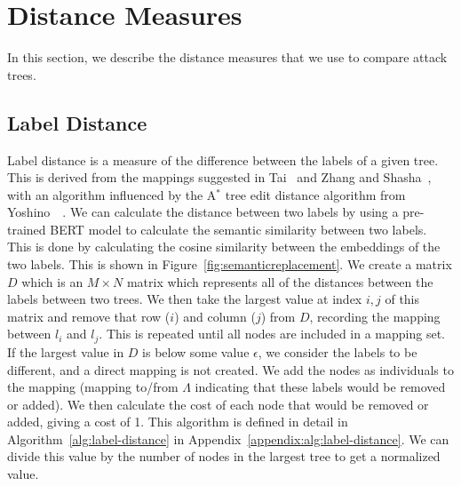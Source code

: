 \section{Distance Measures}
\label{sec:distance}

In this section, we describe the distance measures that we use to compare attack trees. 




\subsection{Label Distance}
\label{ssec:label-distance}

Label distance is a measure of the difference between the labels of a given tree. This is derived from the mappings suggested in Tai~\cite{tai_tree--tree_1979} and Zhang and Shasha~\cite{Zhang_Shasha_1989}, with an algorithm influenced by the A$^*$ tree edit distance algorithm from Yoshino~\etal~\cite{yoshino_dynamic_2013}. We can calculate the distance between two labels by using a pre-trained BERT model to calculate the semantic similarity between two labels. This is done by calculating the cosine similarity between the embeddings of the two labels. This is shown in Figure~\ref{fig:semanticreplacement}. We create a matrix $D$ which is an $M \times N$ matrix which represents all of the distances between the labels between two trees. We then take the largest value at index $i, j$ of this matrix and remove that row ($i$) and column ($j$) from $D$, recording the mapping between $l_i$ and $l_j$. This is repeated until all nodes are included in a mapping set. If the largest value in $D$ is below some value $\epsilon$, we consider the labels to be different, and a direct mapping is not created. We add the nodes as individuals to the mapping (mapping to/from $\Lambda$ indicating that these labels would be removed or added). We then calculate the cost of each node that would be removed or added, giving a cost of 1. This algorithm is defined in detail in Algorithm~\ref{alg:label-distance} in Appendix~\ref{appendix:alg:label-distance}. We can divide this value by the number of nodes in the largest tree to get a normalized value.



